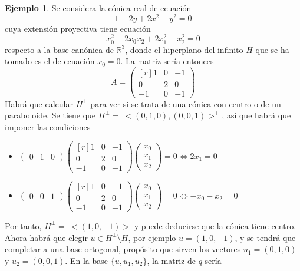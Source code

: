 \documentclass[12pt]{report}
\theoremstyle{definition}
\theoremstyle{definition}
\newtheorem{example}{Ejemplo}[chapter]
\theoremstyle{remark}
\newcommand{\R}{\mathbb R}
\begin{document}
\begin{example}
Se considera la cónica real de ecuación
\[1-2y+2x^2-y^2=0\]
cuya extensión proyectiva tiene ecuación
\[x_0^2-2x_0x_2+2x_1^2-x_2^2=0\]
respecto a la base canónica de $\R^3$, donde el hiperplano del infinito $H$ que se ha tomado es el de ecuación $x_0 = 0$. La matriz sería entonces
\[A = \begin{pmatrix*}[r]
    1 & 0 & -1 \\
    0 & 2 & 0 \\
    -1 & 0 & -1
\end{pmatrix*}\]
Habrá que calcular $H^\perp$ para ver si se trata de una cónica con centro o de un paraboloide. Se tiene que $H^\perp = \ <(0,1,0),(0,0,1)>^\perp$, así que habrá que imponer las condiciones
\begin{itemize}
    \item $\displaystyle \begin{pmatrix}
        0 & 1 & 0 
    \end{pmatrix}
    \begin{pmatrix*}[r]
    1 & 0 & -1 \\
    0 & 2 & 0 \\
    -1 & 0 & -1
    \end{pmatrix*} \begin{pmatrix}
        x_0 \\
        x_1 \\
        x_2
    \end{pmatrix} = 0 \iff 2x_1 = 0$
   \item $\displaystyle \begin{pmatrix}
        0 & 0 & 1 
    \end{pmatrix}
    \begin{pmatrix*}[r]
    1 & 0 & -1 \\
    0 & 2 & 0 \\
    -1 & 0 & -1
    \end{pmatrix*} \begin{pmatrix}
        x_0 \\
        x_1 \\
        x_2
    \end{pmatrix} = 0 \iff -x_0 -x_2 = 0$
\end{itemize}
Por tanto, $H^\perp = \ <(1,0,-1)>$ y puede deducirse que la cónica tiene centro. Ahora habrá que elegir $u \in H^\perp \setminus H$, por ejemplo $u = (1,0,-1)$, y se tendrá que completar a una base ortogonal, propósito que sirven los vectores $u_1 = (0,1,0)$ y $u_2 = (0,0,1)$. En la base $\{u,u_1,u_2\}$, la matriz de $q$ sería

\end{example}
\end{document}
